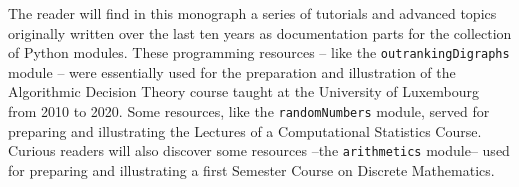 %
%

\preface






The reader will find in this monograph a series of tutorials and advanced topics originally written over the last ten years as documentation parts for the \Digraph collection of Python modules. These programming resources -- like the \texttt{outrankingDigraphs} module -- were essentially used for the preparation and illustration of the Algorithmic Decision Theory course taught at the University of Luxembourg from 2010 to 2020. Some resources, like the \texttt{randomNumbers} module, served for preparing and illustrating the Lectures of a Computational Statistics Course. Curious readers will also discover some resources --the \texttt{arithmetics} module-- used for preparing and illustrating a first Semester Course on Discrete Mathematics.


